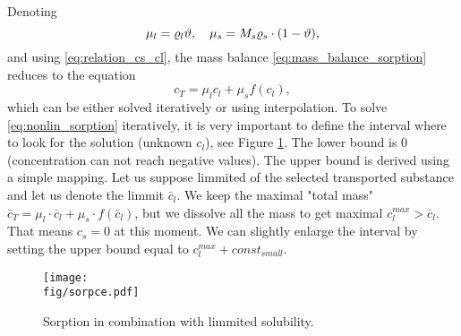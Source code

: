 Denoting
\[ \mu_l = \varrho_l \vartheta, \quad \mu_s = M_s \varrho_s\cdot(1-\vartheta), \]
and using \eqref{eq:relation_cs_cl}, the mass balance \eqref{eq:mass_balance_sorption} reduces to the equation
\begin{equation}
 c_T = \mu_l c_l + \mu_s f(c_l),
 \label{eq:nonlin_sorption}
\end{equation}
which can be either solved iteratively or using interpolation.
To solve \eqref{eq:nonlin_sorption} iteratively, it is very important to define the interval where 
to look for the solution (unknown $c_l$), see Figure \ref{fig:sorpce}. The lower bound is $0$ (concentration can not reach negative values). 
The upper bound is derived using a simple mapping. Let us suppose limmited 
 of the selected transported substance and let us denote the 
limmit $\bar{c}_l$. We keep the maximal "total mass" 
$\bar{c}_T= \mu_l\cdot \bar{c}_l + \mu_s\cdot f(\bar{c}_l)$, but we dissolve all the mass to get 
maximal $c_l^{max} > \bar{c}_l$. That means $c_s = 0$ at this moment. We can slightly enlarge the interval by setting the upper bound equal to 
$c_l^{max} + const_{small}$.

\begin{figure}[ht!]
 \centering
 \texttt{[image: \\fig/sorpce.pdf]}
 \caption{Sorption in combination with limmited solubility.}
 \label{fig:sorpce}
\end{figure}


